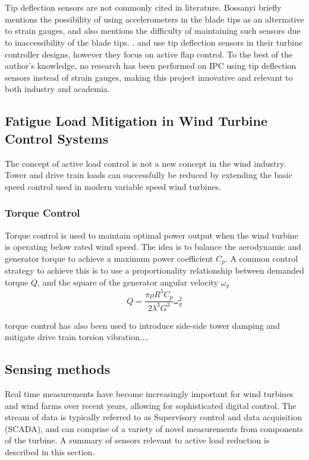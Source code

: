 \\~\\
Tip deflection sensors are not commonly cited in literature. Bossanyi briefly mentions the possibility of using accelerometers in the blade tips as an alternative to strain gauges, and also mentions the difficulty of maintaining such sensors due to inaccessibility of the blade tips. \cite{5_Bossanyi} \cite{15_bossanyi}. \citet{7_Berg} and \citet{10_Wilson} use tip deflection sensors in their turbine controller designs, however they focus on active flap control. To the best of the author's knowledge, no research has been performed on IPC using tip deflection sensors instead of strain gauges, making this project innovative and relevant to both industry and academia.
\subsection{Fatigue Load Mitigation in Wind Turbine Control Systems}
The concept of active load control is not a new concept in the wind industry. Tower and drive train loads can successfully be reduced by extending the basic speed control used in modern variable speed wind turbines.
\subsubsection{Torque Control}
Torque control is used to maintain optimal power output when the wind turbine is operating below rated wind speed. The idea is to balance the aerodynamic and generator torque to achieve a maximum power coefficient $C_p$. A common control strategy to achieve this is to use a proportionality relationship between demanded torque $Q$, and the square of the generator angular velocity $\omega_g$
$$Q = \frac{\pi \rho R^5 C_p}{2\lambda^3 G^3}\omega_g^2$$ \cite{15_bossanyi}

torque control has also been used to introduce side-side tower damping and mitigate drive train torsion vibration....

\subsection{Sensing methods}
Real time measurements have become increasingly important for wind turbines and wind farms over recent years, allowing for sophisticated digital control. The stream of data is typically referred to as Supervisory control and data acquisition (SCADA), and can comprise of a variety of novel measurements from components of the turbine. A summary of sensors relevant to active load reduction is described in this section.
